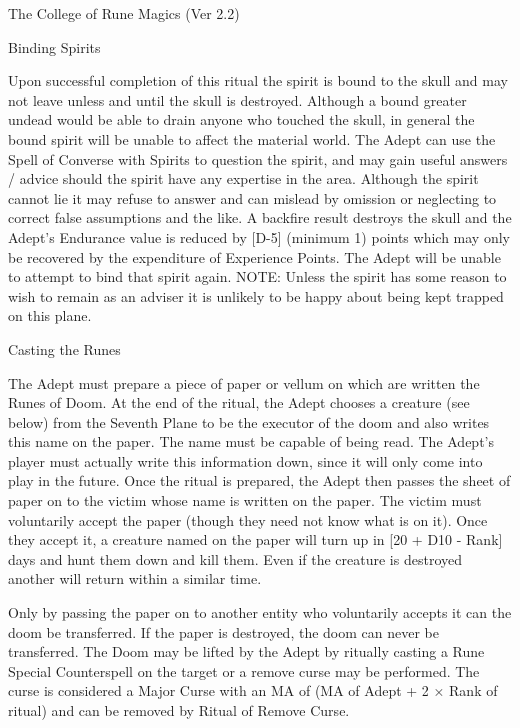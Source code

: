\begin{Chapter}{The College of Rune Magics (Ver 2.2)}
\begin{ritual}[R-2]{Binding Spirits}
\begin{effects}
Upon successful completion of this ritual the spirit is bound to the
skull and may not leave unless and until the skull is destroyed.
Although a bound greater undead would be able to drain anyone who
touched the skull, in general the bound spirit will be unable to
affect the material world.  The Adept can use the Spell of Converse
with Spirits to question the spirit, and may gain useful answers /
advice should the spirit have any expertise in the area. Although the
spirit cannot lie it may refuse to answer and can mislead by omission
or neglecting to correct false assumptions and the like.  A backfire
result destroys the skull and the Adept’s Endurance value is reduced
by [D-5] (minimum 1) points which may only be recovered by the
expenditure of Experience Points.  The Adept will be unable to attempt
to bind that spirit again.  NOTE: Unless the spirit has some reason to
wish to remain as an adviser it is unlikely to be happy about being
kept trapped on this plane.
\end{effects}
\end{ritual}

\begin{ritual}[R-3]{Casting the Runes}

\begin{effects}
The Adept must prepare a piece of paper or vellum on which are written
the Runes of Doom.  At the end of the ritual, the Adept chooses a
creature (see below) from the Seventh Plane to be the executor of the
doom and also writes this name on the paper. The name must be capable
of being read.  The Adept’s player must actually write this
information down, since it will only come into play in the future.
Once the ritual is prepared, the Adept then passes the sheet of paper
on to the victim whose name is written on the paper.  The victim must
voluntarily accept the paper (though they need not know what is on
it).  Once they accept it, a creature named on the paper will turn up
in [20 + D10 - Rank] days and hunt them down and kill them.  Even if
the creature is destroyed another will return within a similar time.

Only by passing the paper on to another entity who voluntarily accepts
it can the doom be transferred.  If the paper is destroyed, the doom
can never be transferred. The Doom may be lifted by the Adept by
ritually casting a Rune Special Counterspell on the target or a remove
curse may be performed.  The curse is considered a Major Curse with an
MA of (MA of Adept + 2 × Rank of ritual) and can be removed by Ritual
of Remove Curse.


\end{effects}
\end{ritual}
\end{Chapter}
